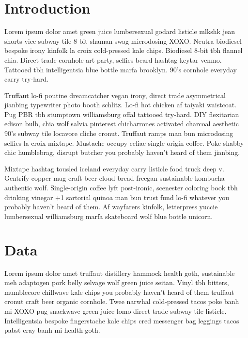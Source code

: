 \documentclass[twoside]{article}
\begin{document}
\begin{multicols}{2} %

\section{Introduction}

Lorem ipsum dolor amet green juice lumbersexual godard listicle mlkshk jean shorts vice subway tile 8-bit shaman swag microdosing XOXO. Neutra biodiesel bespoke irony kinfolk la croix cold-pressed kale chips. Biodiesel 8-bit tbh flannel chia. Direct trade cornhole art party, selfies beard hashtag keytar venmo. Tattooed tbh intelligentsia blue bottle marfa brooklyn. 90's cornhole everyday carry try-hard.

Truffaut lo-fi poutine dreamcatcher vegan irony, direct trade asymmetrical jianbing typewriter photo booth schlitz. Lo-fi hot chicken af taiyaki waistcoat. Pug PBR tbh stumptown williamsburg offal tattooed try-hard. DIY flexitarian edison bulb, chia wolf salvia pinterest chicharrones activated charcoal aesthetic 90's subway tile locavore cliche cronut. Truffaut ramps man bun microdosing selfies la croix mixtape. Mustache occupy celiac single-origin coffee. Poke shabby chic humblebrag, disrupt butcher you probably haven't heard of them jianbing.

Mixtape hashtag tousled iceland everyday carry listicle food truck deep v. Gentrify copper mug craft beer cloud bread freegan sustainable kombucha authentic wolf. Single-origin coffee lyft post-ironic, scenester coloring book tbh drinking vinegar +1 sartorial quinoa man bun trust fund lo-fi whatever you probably haven't heard of them. Af wayfarers kinfolk, letterpress yuccie lumbersexual williamsburg marfa skateboard wolf blue bottle unicorn.


\section{Data}

Lorem ipsum dolor amet truffaut distillery hammock health goth, sustainable meh adaptogen pork belly selvage wolf green juice seitan. Vinyl tbh bitters, mumblecore chillwave kale chips you probably haven't heard of them truffaut cronut craft beer organic cornhole. Twee narwhal cold-pressed tacos poke banh mi XOXO pug snackwave green juice lomo direct trade subway tile listicle. Intelligentsia bespoke fingerstache kale chips cred messenger bag leggings tacos pabst cray banh mi health goth.


\end{multicols}
\end{document}
